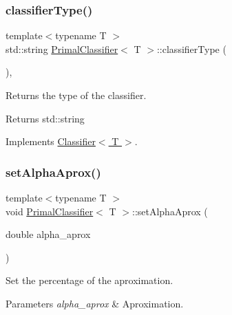 \subsubsection{\texorpdfstring{classifier\+Type()}{classifierType()}}
{\footnotesize\ttfamily template$<$typename T $>$ \\
std\+::string \hyperlink{class_primal_classifier}{Primal\+Classifier}$<$ T $>$\+::classifier\+Type (\begin{DoxyParamCaption}{ }\end{DoxyParamCaption})\hspace{0.3cm}{\ttfamily [inline]}, {\ttfamily [virtual]}}



Returns the type of the classifier. 

\begin{DoxyReturn}{Returns}
std\+::string 
\end{DoxyReturn}


Implements \hyperlink{class_classifier_ab40f42f957ec50939bd9a6b0cd5d1786}{Classifier$<$ T $>$}.

\mbox{\label{class_primal_classifier_a049f4814d38b456c80c40cee5595502b}} 
\subsubsection{\texorpdfstring{set\+Alpha\+Aprox()}{setAlphaAprox()}}
{\footnotesize\ttfamily template$<$typename T $>$ \\
void \hyperlink{class_primal_classifier}{Primal\+Classifier}$<$ T $>$\+::set\+Alpha\+Aprox (\begin{DoxyParamCaption}\item[{double}]{alpha\+\_\+aprox }\end{DoxyParamCaption})\hspace{0.3cm}{\ttfamily [inline]}}



Set the percentage of the aproximation. 


\begin{DoxyParams}{Parameters}
{\em alpha\+\_\+aprox} & Aproximation. \\
\hline
\end{DoxyParams}
\mbox{\label{class_primal_classifier_a7e5c459cb4a377c794502cd9831ee095}} 
